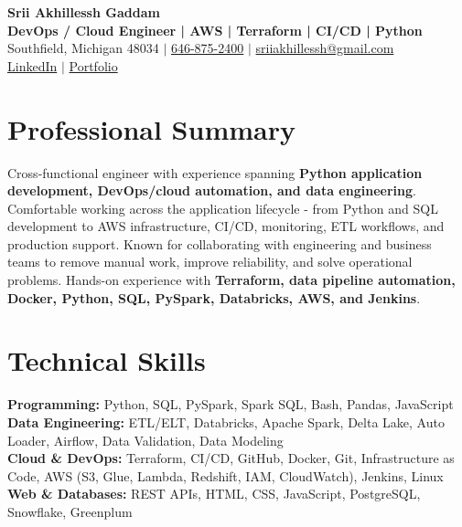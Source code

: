 \documentclass[letterpaper,10pt]{article}
\begin{document}
\fontsize{9.35pt}{10.45pt}\selectfont

\begin{center}
    {\LARGE \textbf{Srii Akhillessh Gaddam}} \\[-1pt]
    \textbf{DevOps / Cloud Engineer | AWS | Terraform | CI/CD | Python} \\[2pt]
    Southfield, Michigan 48034 $|$
    \href{tel:6468752400}{646-875-2400} $|$
    \href{mailto:sriiakhillessh@gmail.com}{sriiakhillessh@gmail.com} \\[1pt]
    \href{https://www.linkedin.com/in/srii-akhiilessh-gaddam-b48668191/}{LinkedIn} $|$
    \href{https://sriiakhillesshg.github.io/portfolio/}{Portfolio}
\end{center}
\vspace{-8pt}

\section{Professional Summary}
\small{Cross-functional engineer with experience spanning \textbf{Python application development, DevOps/cloud automation, and data engineering}. Comfortable working across the application lifecycle - from Python and SQL development to AWS infrastructure, CI/CD, monitoring, ETL workflows, and production support. Known for collaborating with engineering and business teams to remove manual work, improve reliability, and solve operational problems. Hands-on experience with \textbf{Terraform, data pipeline automation, Docker, Python, SQL, PySpark, Databricks, AWS, and Jenkins}.}

\section{Technical Skills}
\small{
\textbf{Programming:} Python, SQL, PySpark, Spark SQL, Bash, Pandas, JavaScript \\
\textbf{Data Engineering:} ETL/ELT, Databricks, Apache Spark, Delta Lake, Auto Loader, Airflow, Data Validation, Data Modeling \\
\textbf{Cloud \& DevOps:} Terraform, CI/CD, GitHub, Docker, Git, Infrastructure as Code, AWS (S3, Glue, Lambda, Redshift, IAM, CloudWatch), Jenkins, Linux \\
\textbf{Web \& Databases:} REST APIs, HTML, CSS, JavaScript, PostgreSQL, Snowflake, Greenplum
}
\end{document}
